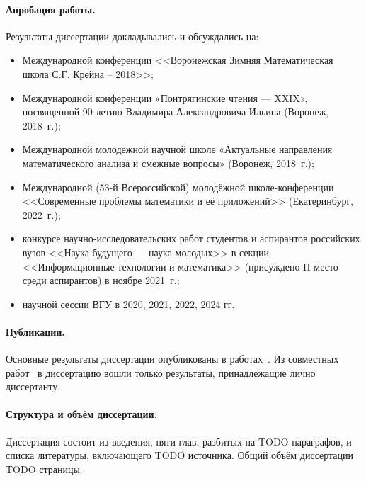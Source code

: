\paragraph{Апробация работы.}
Результаты диссертации докладывались и обсуждались на:
\begin{itemize}
	\item
		Международной конференции <<Воронежская Зимняя Математическая школа С.Г. Крейна – 2018>>;
	\item
		Международной конференции «Понтрягинские чтения — XXIX», посвященной 90-летию Владимира Александровича Ильина (Воронеж, 2018~г.);
	\item
		Международной молодежной научной школе «Актуальные направления математического анализа и смежные вопросы» (Воронеж, 2018~г.);
	\item
		Международной (53-й Всероссийской) молодёжной школе-конференции
		<<Современные проблемы математики и её приложений>>
		(Екатеринбург, 2022~г.);
	\item
		конкурсе научно-исследовательских работ студентов и аспирантов российских вузов
		<<Наука будущего --- наука молодых>> в секции <<Информационные технологии и математика>>
		(присуждено II место среди аспирантов) в ноябре 2021~г.;
	\item научной сессии ВГУ в 2020, 2021, 2022, 2024 гг. %
\end{itemize}


\paragraph{Публикации.}
Основные результаты диссертации опубликованы в работах~.
Из совместных работ~
в диссертацию вошли только результаты, принадлежащие лично диссертанту.

\paragraph{Структура и объём диссертации.}
Диссертация состоит из введения, пяти глав, разбитых на TODO параграфов,
и списка литературы, включающего TODO источника.
Общий объём диссертации TODO страницы.
